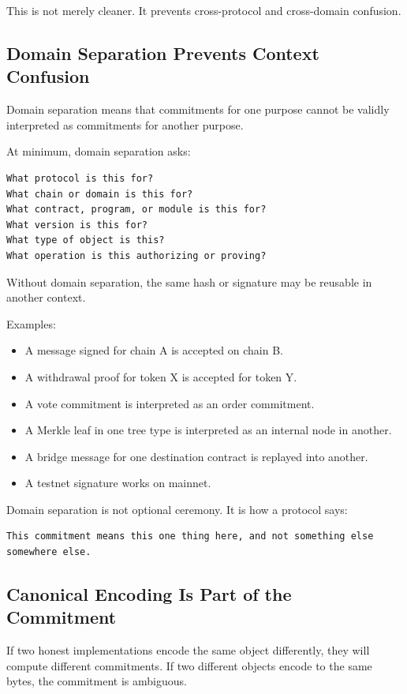 This is not merely cleaner. It prevents cross-protocol and cross-domain
confusion.

\subsection{Domain Separation Prevents Context Confusion}

Domain separation means that commitments for one purpose cannot be
validly interpreted as commitments for another purpose.

At minimum, domain separation asks:

\begin{lstlisting}
What protocol is this for?
What chain or domain is this for?
What contract, program, or module is this for?
What version is this for?
What type of object is this?
What operation is this authorizing or proving?
\end{lstlisting}

Without domain separation, the same hash or signature may be reusable in
another context.

Examples:

\begin{itemize}
\tightlist
\item
  A message signed for chain A is accepted on chain B.
\item
  A withdrawal proof for token X is accepted for token Y.
\item
  A vote commitment is interpreted as an order commitment.
\item
  A Merkle leaf in one tree type is interpreted as an internal node in
  another.
\item
  A bridge message for one destination contract is replayed into
  another.
\item
  A testnet signature works on mainnet.
\end{itemize}

Domain separation is not optional ceremony. It is how a protocol says:

\begin{lstlisting}
This commitment means this one thing here, and not something else somewhere else.
\end{lstlisting}

\subsection{Canonical Encoding Is Part of the Commitment}

If two honest implementations encode the same object differently, they
will compute different commitments. If two different objects encode to
the same bytes, the commitment is ambiguous.

